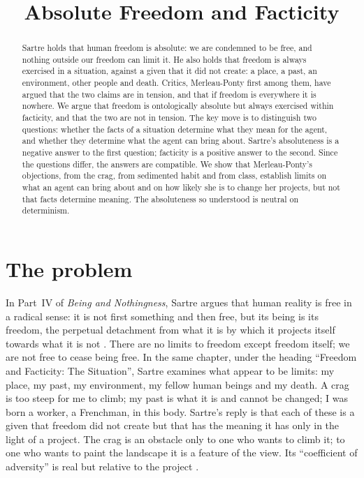 \documentclass{situationist-preprint}
\title{Absolute Freedom and Facticity}
\begin{document}
\maketitle

\begin{abstract}
Sartre holds that human freedom is absolute: we are condemned to be free, and nothing outside our freedom can limit it. He also holds that freedom is always exercised in a situation, against a given that it did not create: a place, a past, an environment, other people and death. Critics, Merleau-Ponty first among them, have argued that the two claims are in tension, and that if freedom is everywhere it is nowhere. We argue that freedom is ontologically absolute but always exercised within facticity, and that the two are not in tension. The key move is to distinguish two questions: whether the facts of a situation determine what they mean for the agent, and whether they determine what the agent can bring about. Sartre's absoluteness is a negative answer to the first question; facticity is a positive answer to the second. Since the questions differ, the answers are compatible. We show that Merleau-Ponty's objections, from the crag, from sedimented habit and from class, establish limits on what an agent can bring about and on how likely she is to change her projects, but not that facts determine meaning. The absoluteness so understood is neutral on determinism.
\end{abstract}

\section{The problem}

In Part~IV of \emph{Being and Nothingness}, Sartre argues that human reality is free in a radical sense: it is not first something and then free, but its being is its freedom, the perpetual detachment from what it is by which it projects itself towards what it is not \citep[Part~IV, ch.~1]{Sartre1943}. There are no limits to freedom except freedom itself; we are not free to cease being free. In the same chapter, under the heading \enquote{Freedom and Facticity: The Situation}, Sartre examines what appear to be limits: my place, my past, my environment, my fellow human beings and my death. A crag is too steep for me to climb; my past is what it is and cannot be changed; I was born a worker, a Frenchman, in this body. Sartre's reply is that each of these is a given that freedom did not create but that has the meaning it has only in the light of a project. The crag is an obstacle only to one who wants to climb it; to one who wants to paint the landscape it is a feature of the view. Its \enquote{coefficient of adversity} is real but relative to the project \citep[Part~IV, ch.~1]{Sartre1943}.
\end{document}
